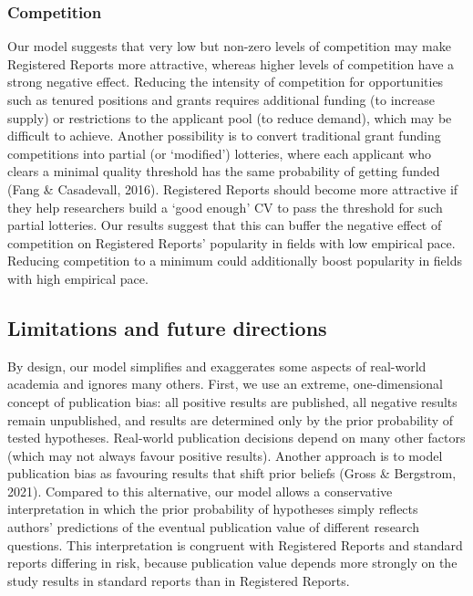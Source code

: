 \documentclass[
  british,
  a4paper,
  ,man,floatsintext]{apa6}
\begin{document}
\par\vspace{0.4\baselineskip}

\subsubsection{Competition}\label{competition-1}

Our model suggests that very low but non-zero levels of competition may make Registered Reports more attractive, whereas higher levels of competition have a strong negative effect.
Reducing the intensity of competition for opportunities such as tenured positions and grants requires additional funding (to increase supply) or restrictions to the applicant pool (to reduce demand), which may be difficult to achieve.
Another possibility is to convert traditional grant funding competitions into partial (or `modified') lotteries, where each applicant who clears a minimal quality threshold has the same probability of getting funded (Fang \& Casadevall, 2016).
Registered Reports should become more attractive if they help researchers build a `good enough' CV to pass the threshold for such partial lotteries.
Our results suggest that this can buffer the negative effect of competition on Registered Reports' popularity in fields with low empirical pace.
Reducing competition to a minimum could additionally boost popularity in fields with high empirical pace.

\subsection{Limitations and future directions}\label{limitations-and-future-directions}

By design, our model simplifies and exaggerates some aspects of real-world academia and ignores many others.
First, we use an extreme, one-dimensional concept of publication bias: all positive results are published, all negative results remain unpublished, and results are determined only by the prior probability of tested hypotheses.
Real-world publication decisions depend on many other factors (which may not always favour positive results).
Another approach is to model publication bias as favouring results that shift prior beliefs (Gross \& Bergstrom, 2021).
Compared to this alternative, our model allows a conservative interpretation in which the prior probability of hypotheses simply reflects authors' predictions of the eventual publication value of different research questions.
This interpretation is congruent with Registered Reports and standard reports differing in risk, because publication value depends more strongly on the study results in standard reports than in Registered Reports.
\end{document}
